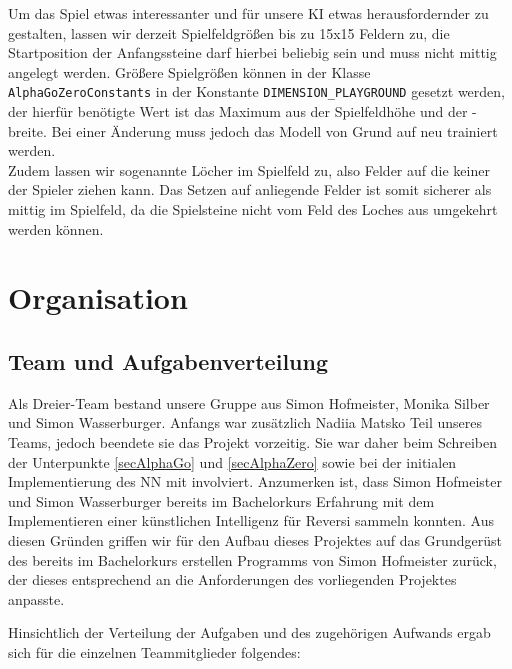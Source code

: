 \documentclass[12pt,a4paper]{article}
\begin{document}
Um das Spiel etwas interessanter und f\"{u}r unsere KI etwas herausfordernder zu gestalten, lassen wir derzeit Spielfeldgr\"{o}\ss en bis zu 15x15 Feldern zu, die Startposition der Anfangssteine darf hierbei beliebig sein und muss nicht mittig angelegt werden. Gr\"{o}\ss ere Spielgr\"{o}\ss en k\"{o}nnen in der Klasse \texttt{AlphaGoZeroConstants} in der Konstante \texttt{DIMENSION\_PLAYGROUND} gesetzt werden, der hierf\"{u}r ben\"{o}tigte Wert ist das Maximum aus der Spielfeldh\"{o}he und der -breite. Bei einer \"{A}nderung muss jedoch das Modell von Grund auf neu trainiert werden.\\
Zudem lassen wir sogenannte L\"{o}cher im Spielfeld zu, also Felder auf die keiner der Spieler ziehen kann. Das Setzen auf anliegende Felder ist somit sicherer als mittig im Spielfeld, da die Spielsteine nicht vom Feld des Loches aus umgekehrt werden k\"{o}nnen.


\newpage

\section{Organisation}

\subsection{Team und Aufgabenverteilung}

Als Dreier-Team bestand unsere Gruppe aus Simon Hofmeister, Monika Silber und Simon Wasserburger. Anfangs war zusätzlich Nadiia Matsko Teil unseres Teams, jedoch beendete sie das Projekt vorzeitig. Sie war daher beim Schreiben der Unterpunkte  \ref{secAlphaGo} und \ref{secAlphaZero} sowie bei der initialen Implementierung des NN mit involviert. Anzumerken ist, dass Simon Hofmeister und Simon Wasserburger bereits im Bachelorkurs Erfahrung mit dem Implementieren einer künstlichen Intelligenz für Reversi sammeln konnten. Aus diesen Gründen griffen wir für den Aufbau dieses Projektes auf das Grundgerüst des bereits im Bachelorkurs erstellen Programms von Simon Hofmeister zurück, der dieses entsprechend an die Anforderungen des vorliegenden Projektes anpasste.

Hinsichtlich der Verteilung der Aufgaben und des zugehörigen Aufwands ergab sich für die einzelnen Teammitglieder folgendes:
\end{document}
